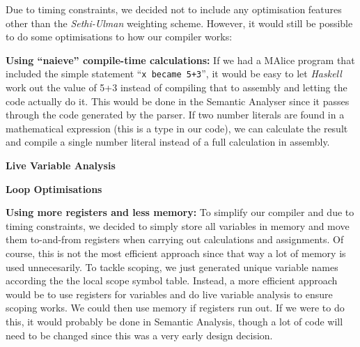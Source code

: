 \documentclass[a4wide, 10pt]{article}
\begin{document}
Due to timing constraints, we decided not to include any optimisation features
other than the \textit{Sethi-Ulman} weighting scheme. However, it would
still be possible to do some optimisations to how our compiler works:



\textbf{Using ``naieve'' compile-time calculations:} If we had a MAlice
program that included the simple statement ``\texttt{x became 5+3}'', it would 
be easy to let \textit{Haskell} work out the value of 5+3 instead of compiling 
that to assembly and letting the code actually do it. This would be done in the
Semantic Analyser since it passes through the code generated by the parser. If
two number literals are found in a mathematical expression (this is a type  
in our code), we can calculate the result and compile a single number literal
instead of a full calculation in assembly.

\textbf{Live Variable Analysis} 



\textbf{Loop Optimisations} 




\textbf{Using more registers and less memory:} To simplify our compiler and due
to timing constraints, we decided to simply store all variables in memory and 
move them to-and-from registers when carrying out calculations and assignments.
Of course, this is not the most efficient approach since that way a lot of 
memory is used unnecesarily. To tackle scoping, we just generated unique 
variable names according the the local scope symbol table. Instead, a more 
efficient approach would be to use registers for variables and do live variable
analysis to ensure scoping works. We could then use memory if registers run out.
If we were to do this, it would probably be done in Semantic Analysis, though a
lot of code will need to be changed since this was a very early design decision.
\end{document}

